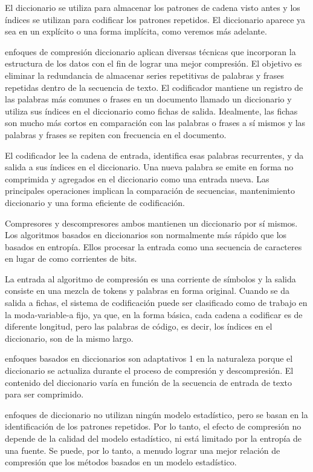  


El diccionario se utiliza para almacenar los patrones de cadena visto antes y los índices se utilizan para codificar los patrones repetidos. El diccionario aparece ya sea en un explícito o una forma implícita, como veremos más adelante.

enfoques de compresión diccionario aplican diversas técnicas que incorporan la estructura de los datos con el fin de lograr una mejor compresión. El objetivo es eliminar la redundancia de almacenar series repetitivas de palabras y frases repetidas dentro de la secuencia de texto. El codificador mantiene un registro de las palabras más comunes o frases en un documento llamado un diccionario y utiliza sus índices en el diccionario como fichas de salida. Idealmente, las fichas son mucho más cortos en comparación con las palabras o frases a sí mismos y las palabras y frases se repiten con frecuencia en el documento.

El codificador lee la cadena de entrada, identifica esas palabras recurrentes, y da salida a sus índices en el diccionario. Una nueva palabra se emite en forma no comprimida y agregados en el diccionario como una entrada nueva. Las principales operaciones implican la comparación de secuencias, mantenimiento diccionario y una forma eficiente de codificación.

Compresores y descompresores ambos mantienen un diccionario por sí mismos. Los algoritmos basados en diccionarios son normalmente más rápido que los basados en entropía. Ellos procesar la entrada como una secuencia de caracteres en lugar de como corrientes de bits.



La entrada al algoritmo de compresión es una corriente de símbolos y la salida consiste en una mezcla de tokens y palabras en forma original. Cuando se da salida a fichas, el sistema de codificación puede ser clasificado como de trabajo en la moda-variable-a fijo, ya que, en la forma básica, cada cadena a codificar es de diferente longitud, pero las palabras de código, es decir, los índices en el diccionario, son de la mismo largo.




enfoques basados en diccionarios son adaptativos 1 en la naturaleza porque el diccionario se actualiza durante el proceso de compresión y descompresión. El contenido del diccionario varía en función de la secuencia de entrada de texto para ser comprimido.




enfoques de diccionario no utilizan ningún modelo estadístico, pero se basan en la identificación de los patrones repetidos. Por lo tanto, el efecto de compresión no depende de la calidad del modelo estadístico, ni está limitado por la entropía de una fuente. Se puede, por lo tanto, a menudo lograr una mejor relación de compresión que los métodos basados en un modelo estadístico.



